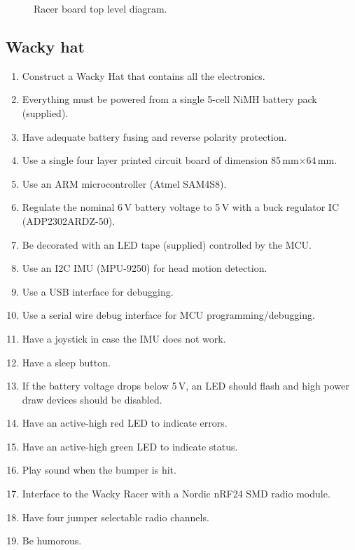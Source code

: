 \documentclass[11pt, a4paper]{article}
\begin{document}
\vspace{1cm}

\begin{figure}[h]
    \centering
    
    \caption{Racer board top level diagram.}
\end{figure}


\vfill\pagebreak

\subsection{Wacky hat}


\begin{enumerate}
\item Construct a Wacky Hat that contains all the electronics.
\item Everything must be powered from a single 5-cell NiMH battery pack (supplied).
\item Have adequate battery fusing and reverse polarity protection.
\item Use a single four layer printed circuit board of dimension 85\,mm$\times$64\,mm.
\item Use an ARM microcontroller (Atmel SAM4S8).
\item Regulate the nominal 6\,V battery voltage to 5\,V with a buck
  regulator IC (ADP2302ARDZ-50).
\item Be decorated with an LED tape (supplied) controlled by the MCU.
\item Use an I2C IMU (MPU-9250) for head motion detection.
\item Use a USB interface for debugging.
\item Use a serial wire debug interface for MCU programming/debugging.
\item Have a joystick in case the IMU does not work.
\item Have a sleep button.
\item If the battery voltage drops below 5\,V, an LED should flash and high power draw devices should be disabled.
\item Have an active-high red LED to indicate errors.
\item Have an active-high green LED to indicate status.
\item Play sound when the bumper is hit.
\item Interface to the Wacky Racer with a Nordic nRF24 SMD radio module.
\item Have four jumper selectable radio channels.
\item Be humorous.
\end{enumerate}
\end{document}
